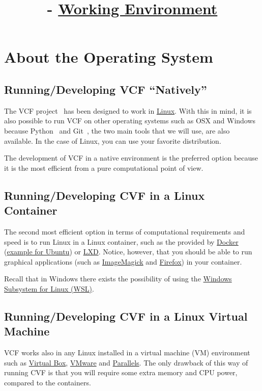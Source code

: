 

\title{\SM{} - \href{https://github.com/Sistemas-Multimedia/Sistemas-Multimedia.github.io/tree/master/contents/working_environment}{Working Environment}}

\maketitle

\tableofcontents

\section{About the Operating System}

\subsection{Running/Developing VCF ``Natively''}
The VCF project~\cite{vruiz__VCF} has been designed to work in
\href{https://en.wikipedia.org/wiki/Linux}{Linux}. With this in mind, it is
also possible to run VCF on other operating systems such as OSX and
Windows because Python~\cite{vruiz__YAPT} and
Git~\cite{vruiz__GitHub}, the two main tools that we will use, are
also available. In the case of Linux, you can use your favorite
distribution.

The development of VCF in a native environment is the preferred option
because it is the most efficient from a pure computational point of
view.

\subsection{Running/Developing CVF in a Linux Container}
The second most efficient option in terms of computational
requirements and speed is to run Linux in a Linux container, such
as the provided by \href{https://hub.docker.com/}{Docker}
(\href{https://hub.docker.com/_/ubuntu}{example for Ubuntu})
or \href{https://linuxcontainers.org/}{LXD}. Notice, however, that you
should be able to run graphical applications (such
as \href{https://linuxcontainers.org/}{ImageMagick}
and \href{https://www.mozilla.org/firefox}{Firefox}) in your
container.

Recall that in Windows there exists the possibility of using the
\href{https://learn.microsoft.com/en-us/windows/wsl/install}{Windows
  Subsystem for Linux (WSL)}.

\subsection{Running/Developing CVF in a Linux Virtual Machine}
VCF works also in any Linux installed in a virtual machine (VM)
environment such as \href{https://www.virtualbox.org/}{Virtual Box},
\href{https://www.vmware.com/}{VMware} and \href{https://www.vmware.com/}{Parallels}.
The only drawback of this way of running CVF is that you will require
some extra memory and CPU power, compared to the containers.

